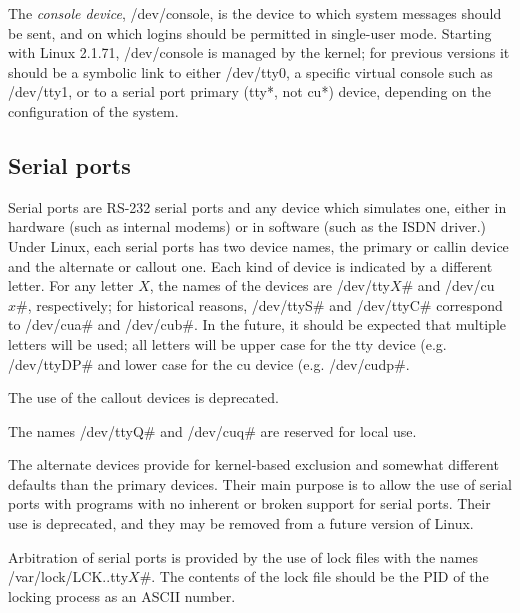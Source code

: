 The {\em console device\/}, {\file /dev/console}, is the device to
which system messages should be sent, and on which logins should be
permitted in single-user mode.  Starting with Linux 2.1.71, {\file
/dev/console} is managed by the kernel; for previous versions it
should be a symbolic link to either {\file /dev/tty0}, a specific
virtual console such as {\file /dev/tty1}, or to a serial port primary
({\file tty*}, not {\file cu*}) device, depending on the configuration
of the system.

\subsection{Serial ports}

Serial ports are RS-232 serial ports and any device which simulates
one, either in hardware (such as internal modems) or in software (such
as the ISDN driver.)  Under Linux, each serial ports has two device
names, the primary or callin device and the alternate or callout one.
Each kind of device is indicated by a different letter.  For any
letter $X$, the names of the devices are {\file /dev/tty${X\#}$} and
{\file /dev/cu${x\#}$}, respectively; for historical reasons, {\file
/dev/ttyS$\#$} and {\file /dev/ttyC$\#$} correspond to {\file
/dev/cua$\#$} and {\file /dev/cub$\#$}.  In the future, it should be
expected that multiple letters will be used; all letters will be upper
case for the {\file tty} device (e.g. {\file /dev/ttyDP$\#$} and lower
case for the {\file cu} device (e.g. {\file /dev/cudp$\#$}.

The use of the callout devices is deprecated.

The names {\file /dev/ttyQ$\#$} and {\file /dev/cuq$\#$} are reserved
for local use.

The alternate devices provide for kernel-based exclusion and somewhat
different defaults than the primary devices.  Their main purpose is to
allow the use of serial ports with programs with no inherent or broken
support for serial ports.  Their use is deprecated, and they may be
removed from a future version of Linux.

Arbitration of serial ports is provided by the use of lock files with
the names {\file /var/lock/LCK..tty${X\#}$}.  The contents of the lock
file should be the PID of the locking process as an ASCII number.

